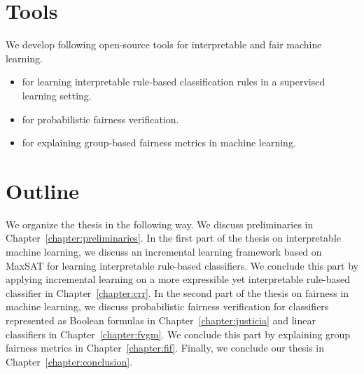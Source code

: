 \section{Tools}
	We develop following open-source tools for interpretable and fair machine learning.
	\begin{itemize}
		\item \href{https://github.com/meelgroup/MLIC}{{\imli}} for learning interpretable rule-based classification rules in a supervised learning setting.
		\item  \href{https://github.com/meelgroup/justicia}{\justicia} for probabilistic fairness verification.
		\item \href{https://github.com/ReAILe/bias-explainer}{\fairXplainer} for explaining group-based fairness metrics in machine learning.
	\end{itemize}
\section{Outline}
We organize the thesis in the following way. We discuss preliminaries in Chapter~\ref{chapter:preliminaries}. In the first part of the thesis on interpretable machine learning, we discuss an incremental learning framework based on MaxSAT for learning interpretable rule-based classifiers. We conclude this part by applying incremental learning on a more expressible yet interpretable rule-based classifier in Chapter~\ref{chapter:crr}. In the second part of the thesis on fairness in machine learning, we discuss probabilistic fairness verification for classifiers represented as Boolean formulas in Chapter~\ref{chapter:justicia} and linear classifiers in Chapter~\ref{chapter:fvgm}. We conclude this part by explaining group fairness metrics in Chapter~\ref{chapter:fif}. Finally, we conclude our thesis in Chapter~\ref{chapter:conclusion}.


